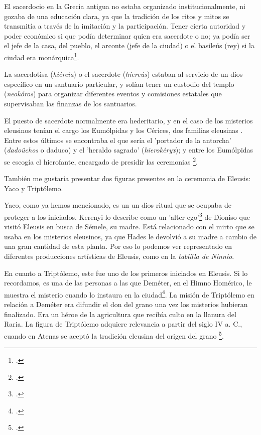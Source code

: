 El sacerdocio en la Grecia antigua  no estaba organizado institucionalmente, ni gozaba de una educación clara, ya que la tradición de los ritos y mitos se transmitía a través de la imitación y la participación. Tener cierta autoridad y poder económico si que podía determinar quien era sacerdote o no; ya podía ser el jefe de la casa, del pueblo, el arconte (jefe de la ciudad) o el basileús (rey) si la ciudad era monárquica\footcite[302]{burkertReligionGriegaArcaica2007}.

La sacerdotisa (\textit{hiéreia}) o el sacerdote (\textit{hiereús}) estaban al servicio de un dios específico en un santuario particular, y solían tener un custodio del templo (\textit{neokóros}) para organizar diferentes eventos y comisiones estatales que supervisaban las finanzas de los santuarios.

El puesto de sacerdote normalmente era hederitario, y en el caso de los misterios eleusinos tenían el cargo los Eumólpidas y los Cérices, dos familias eleusinas . Entre estos últimos se encontraba el que sería el 'portador de la antorcha' (\textit{dadoûchos} o daduco) y el 'heraldo sagrado' (\textit{hierokéryx}); y entre los Eumólpidas  se escogía el hierofante, encargado de presidir las ceremonias \footcite[133]{burkertReligionGriegaArcaica2007}.

También me gustaría presentar dos figuras presentes en la ceremonia de Eleusis: Yaco y Triptólemo. 

Yaco, como ya hemos mencionado, es un un dios ritual que se ocupaba de proteger a los iniciados. Kerenyi lo describe como un 'alter ego'\footcite[84]{kerenyiEleusisImagenArquetipica2004} de Dioniso que visitó Eleusis en busca de Sémele, su madre. Está relacionado con el mirto que se usaba en los misterios eleusinos, ya que Hades le devolvió a su madre a cambio de una gran cantidad de esta planta. Por eso lo podemos ver representado en diferentes producciones artísticas de Eleusis, como en la \textit{tablilla de Ninnio}. 

En cuanto a Triptólemo, este fue uno de los primeros iniciados en Eleusis. Si lo recordamos, es una de las personas a las que Deméter, en el Himno Homérico, le muestra el misterio cuando lo instaura en la ciudad\footcite[89]{b.torresHimnoHomericoDemeter2001}. La misión de Triptólemo en relación a Deméter era difundir el don del grano una vez los misterios hubieran finalizado. Era un héroe de la agricultura que recibía culto en la llanura del Raria. La figura de Triptólemo adquiere relevancia a partir del siglo IV a. C., cuando en Atenas se aceptó la tradición eleusina del origen del grano \footcite[137-141]{kerenyiEleusisImagenArquetipica2004}.

